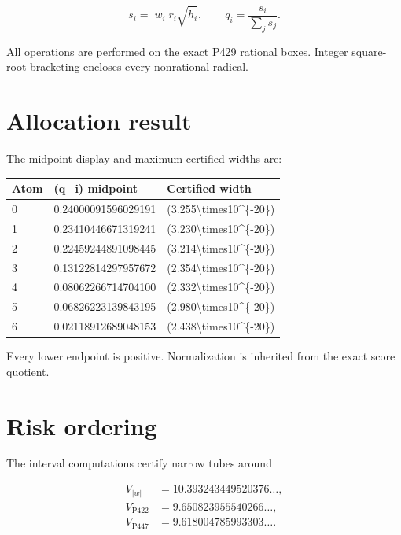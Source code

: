 \documentclass[11pt,a4paper,openany]{report}
\begin{document}
\[
s_i=|w_i|r_i\sqrt{\overline h_i},
\qquad
q_i=\frac{s_i}{\sum_js_j}.
\]

All operations are performed on the exact P429 rational boxes. Integer square-root bracketing encloses every nonrational radical.

\section{Allocation result}

The midpoint display and maximum certified widths are:

\begin{center}
\begingroup\small
\setlength{\tabcolsep}{2.5pt}
\renewcommand{\arraystretch}{1.16}
\begin{longtable}{@{}p{}p{}p{}@{}}
\toprule
\textbf{Atom} & \textbf{(q\_i) midpoint} & \textbf{Certified width} \\
\midrule
\endhead
0 & 0.24000091596029191 & (3.255\textbackslash{}times10\textasciicircum{}\{-20\}) \\
1 & 0.23410446671319241 & (3.230\textbackslash{}times10\textasciicircum{}\{-20\}) \\
2 & 0.22459244891098445 & (3.214\textbackslash{}times10\textasciicircum{}\{-20\}) \\
3 & 0.13122814297957672 & (2.354\textbackslash{}times10\textasciicircum{}\{-20\}) \\
4 & 0.08062266714704100 & (2.332\textbackslash{}times10\textasciicircum{}\{-20\}) \\
5 & 0.06826223139843195 & (2.980\textbackslash{}times10\textasciicircum{}\{-20\}) \\
6 & 0.02118912689048153 & (2.438\textbackslash{}times10\textasciicircum{}\{-20\}) \\
\bottomrule
\end{longtable}
\endgroup
\end{center}

Every lower endpoint is positive. Normalization is inherited from the exact score quotient.

\section{Risk ordering}

The interval computations certify narrow tubes around

\[
\begin{aligned}
V_{|w|}&=10.393243449520376\ldots,\\
V_{\mathrm{P422}}&=9.650823955540266\ldots,\\
V_{\mathrm{P447}}&=9.618004785993303\ldots.
\end{aligned}
\]
\end{document}
